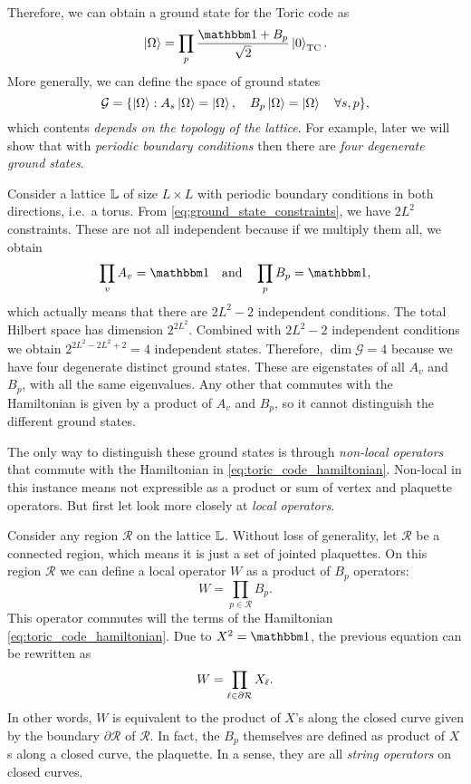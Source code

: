 Therefore, we can obtain a ground state for the Toric code as
\begin{equation}
    \ket{\Omega} = \prod_{p} \frac{\identity + B_p}{\sqrt{2}} \ket{0}_{\text{TC}}.
\end{equation}
More generally, we can define the space of ground states
\begin{equation}
    \mathcal{G} = \qty{ \ket{\Omega} : A_s \ket{\Omega} = \ket{\Omega}, \quad B_p \ket{\Omega} = \ket{\Omega} \quad \forall s, p },
    \label{eq:TC_protected_subspace}
\end{equation}
which contents \emph{depends on the topology of the lattice}.
For example, later we will show that with \emph{periodic boundary conditions} then there are
\emph{four degenerate ground states}.


Consider a lattice $\mathbb{L}$ of size $L \times L$ with periodic boundary conditions in both directions, i.e.~a torus.
From \eqref{eq:ground_state_constraints}, we have $2L^2$ constraints.
These are not all independent because if we multiply them all, we obtain
\begin{equation}
    \prod_{v} A_v = \identity \qand
    \prod_{p} B_p = \identity,
\end{equation}
which actually means that there are $2L^2 - 2$ independent conditions.
The total Hilbert space has dimension $2^{2L^2}$.
Combined with $2L^2 - 2$ independent conditions we obtain $2^{2L^2 - 2L^2 + 2} = 4$ independent states.
Therefore, $\dim \mathcal{G} = 4$ because we have four degenerate distinct ground states.
These are eigenstates of all $A_v$ and $B_p$, with all the same eigenvalues.
Any other that commutes with the Hamiltonian is given by a product of $A_v$ and $B_p$, so it cannot distinguish the different ground states.


The only way to distinguish these ground states is through \emph{non-local operators} that commute with the Hamiltonian in \eqref{eq:toric_code_hamiltonian}.
Non-local in this instance means not expressible as a product or sum of vertex and plaquette operators.
But first let look more closely at \emph{local operators}.


Consider any region $\mathcal{R}$ on the lattice $\mathbb{L}$.
Without loss of generality, let $\mathcal{R}$ be a connected region, which means it is just a set of jointed plaquettes.
On this region $\mathcal{R}$ we can define a local operator $W$ as a product of $B_p$ operators:
\begin{equation}
    W = \prod_{p \in \mathcal{R}} B_p.
\end{equation}
This operator commutes will the terms of the Hamiltonian \eqref{eq:toric_code_hamiltonian}.
Due to $X^2 = \identity$, the previous equation can be rewritten as
\begin{equation}
    W = \prod_{\ell \in \partial \mathcal{R}} X_{\ell}.
\end{equation}
In other words, $W$ is equivalent to the product of $X$'s along the closed curve given by the boundary $\partial \mathcal{R}$ of $\mathcal{R}$.
In fact, the $B_p$ themselves are defined as product of $X$s along a closed curve, the plaquette.
In a sense, they are all \emph{string operators} on closed curves.

